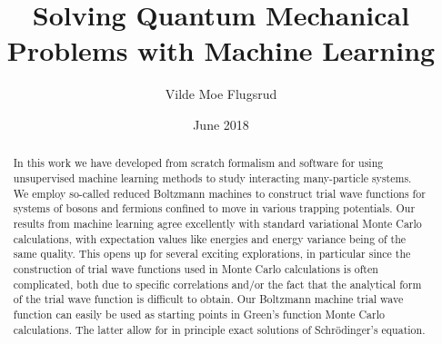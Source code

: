 \documentclass[twoside,english]{uiofysmaster}
\author{Vilde Moe Flugsrud}
\title{Solving Quantum Mechanical Problems with Machine Learning}
\date{June 2018}
\begin{document}
\maketitle

\begin{abstract}
In this work we have developed from scratch formalism and software for
using unsupervised machine learning methods to study interacting
many-particle systems. We employ so-called reduced Boltzmann machines
to construct trial wave functions for systems of bosons and fermions
confined to move in various trapping potentials.  Our results from
machine learning agree excellently with standard variational Monte
Carlo calculations, with expectation values like energies and  energy
variance being of the same quality. This opens up for several exciting
explorations, in particular since the construction of trial wave
functions used in Monte Carlo calculations is often complicated, both
due to specific correlations and/or the fact that the analytical form
of the trial wave function is difficult to obtain. Our Boltzmann
machine trial wave function can easily be used as starting points in
Green's function Monte Carlo calculations. The latter allow for in
principle exact solutions of Schr\"odinger's equation.
\end{abstract}
\end{document}
